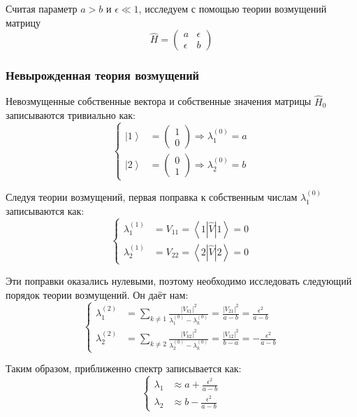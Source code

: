 \documentclass[a4paper,12pt]{article}
\begin{document}
Считая параметр $a>b$ и $\epsilon\ll1$, исследуем с помощью теории
возмущений матрицу 
\[
\hat{H}=\begin{pmatrix}a & \epsilon\\
\epsilon & b
\end{pmatrix}
\]



\subsubsection*{Невырожденная теория возмущений}

Невозмущенные собственные вектора и собственные значения матрицы $\hat{H}_{0}$
записываются тривиально как:
\[
\begin{cases}
\left|1\right\rangle  & =\begin{pmatrix}1\\
0
\end{pmatrix}\Rightarrow\lambda_{1}^{(0)}=a\\
\left|2\right\rangle  & =\begin{pmatrix}0\\
1
\end{pmatrix}\Rightarrow\lambda_{2}^{(0)}=b
\end{cases}
\]


\noindent
Следуя теории возмущений, первая поправка к собственным числам $\lambda_{1}^{(0)}$
записываются как:
\[
\begin{cases}
\lambda_{1}^{(1)} & =V_{11}=\left\langle 1\left|\hat{V}\right|1\right\rangle =0\\
\lambda_{2}^{(1)} & =V_{22}=\left\langle 2\left|\hat{V}\right|2\right\rangle =0
\end{cases}
\]


\noindent
Эти поправки оказались нулевыми, поэтому необходимо исследовать следующий
порядок теории возмущений. Он даёт нам:
\[
\begin{cases}
\lambda_{1}^{(2)} & =\sum_{k\neq1}\frac{\left|V_{k1}\right|^{2}}{\lambda_{1}^{(0)}-\lambda_{k}^{(0)}}=\frac{\left|V_{21}\right|^{2}}{a-b}=\frac{\epsilon^{2}}{a-b}\\
\lambda_{2}^{(2)} & =\sum_{k\neq2}\frac{\left|V_{k2}\right|^{2}}{\lambda_{2}^{(0)}-\lambda_{k}^{(0)}}=\frac{\left|V_{12}\right|^{2}}{b-a}=-\frac{\epsilon^{2}}{a-b}
\end{cases}
\]


\noindent
Таким образом, приближенно спектр записывается как:
\[
\begin{cases}
\lambda_{1} & \approx a+\frac{\epsilon^{2}}{a-b}\\
\lambda_{2} & \approx b-\frac{\epsilon^{2}}{a-b}
\end{cases}
\]
\end{document}
